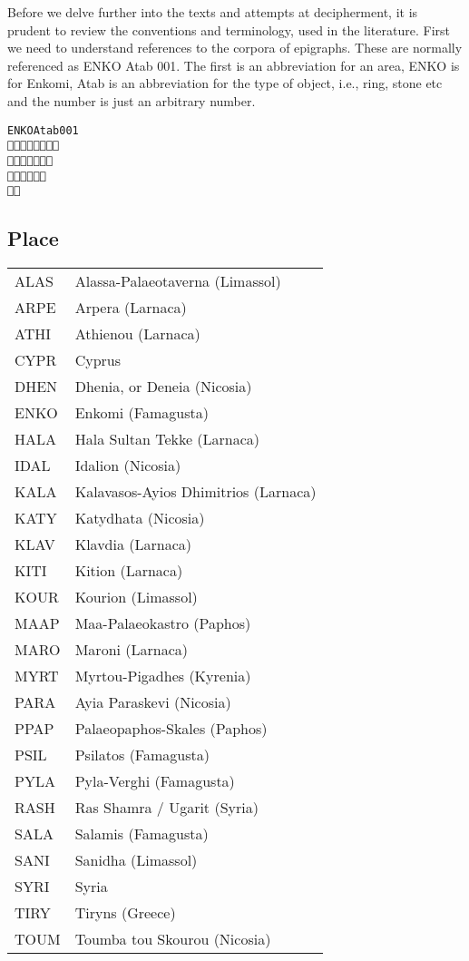 \newfontfamily{}

Before we delve further into the texts and attempts at decipherment, it is prudent to review the conventions and terminology, used in the literature. First we need to understand references to the corpora of epigraphs. These are normally referenced as ENKO Atab 001. The first is an abbreviation for an area, ENKO is for Enkomi, Atab is an abbreviation for the type of object, i.e., ring, stone etc and the number is just an arbitrary number.

\begin{alltt}\cminoan
{\arial ENKO Atab 001} 
󱀀󱀁󱀂󱀃󱀄󱀅󱀆󱀈
 󱀊󱀋󱀌󱀍󱀎󱀏󱀐
󱀑󱀒󱀓󱀔󱀕󱀖
󱀇󱀉
\end{alltt}

\subsection{Place}

\begin{longtable}[l]{>{\ttfamily}ll}
ALAS &Alassa-Palaeotaverna (Limassol)\\
ARPE &Arpera (Larnaca)\\
ATHI &Athienou (Larnaca)\\
CYPR &Cyprus\\
DHEN &Dhenia, or Deneia (Nicosia)\\
ENKO &Enkomi (Famagusta)\\
HALA &Hala Sultan Tekke (Larnaca)\\
IDAL &Idalion (Nicosia)\\
KALA &Kalavasos-Ayios Dhimitrios (Larnaca)\\
KATY &Katydhata (Nicosia)\\
KLAV &Klavdia (Larnaca)\\
KITI &Kition (Larnaca)\\
KOUR &Kourion (Limassol)\\
MAAP &Maa-Palaeokastro (Paphos)\\
MARO &Maroni (Larnaca)\\
MYRT &Myrtou-Pigadhes (Kyrenia)\\
PARA &Ayia Paraskevi (Nicosia)\\
PPAP &Palaeopaphos-Skales (Paphos)\\
PSIL &Psilatos (Famagusta)\\
PYLA &Pyla-Verghi (Famagusta)\\
RASH &Ras Shamra / Ugarit (Syria)\\
SALA &Salamis (Famagusta)\\
SANI &Sanidha (Limassol)\\
SYRI &Syria\\
TIRY &Tiryns (Greece)\\
TOUM &Toumba tou Skourou (Nicosia)\\
\end{longtable}

